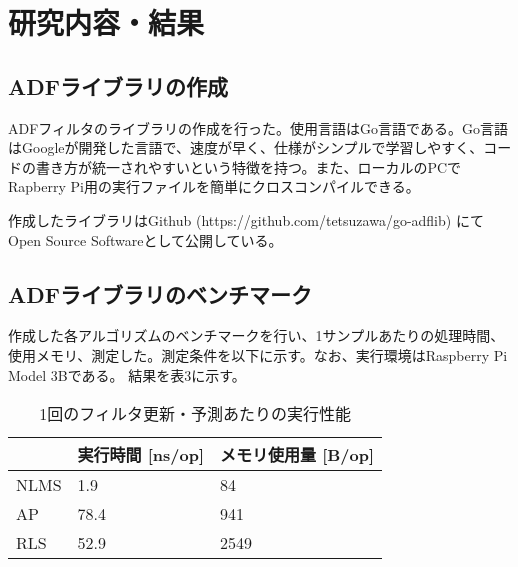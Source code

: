 \documentclass[a4paper]{ltjsarticle}
\begin{document}
\section{研究内容・結果}
  \subsection{ADFライブラリの作成}
    ADFフィルタのライブラリの作成を行った。使用言語はGo言語である。Go言語はGoogleが開発した言語で、速度が早く、仕様がシンプルで学習しやすく、コードの書き方が統一されやすいという特徴を持つ。また、ローカルのPCでRapberry Pi用の実行ファイルを簡単にクロスコンパイルできる。

    作成したライブラリはGithub (https://github.com/tetsuzawa/go-adflib) にてOpen Source Softwareとして公開している。

  \subsection{ADFライブラリのベンチマーク}
    作成した各アルゴリズムのベンチマークを行い、1サンプルあたりの処理時間、使用メモリ、測定した。測定条件を以下に示す。なお、実行環境はRaspberry Pi Model 3Bである。
    結果を表3に示す。

    \begin{table}[]
      \centering
      \caption{1回のフィルタ更新・予測あたりの実行性能}
      \label{tab:exec}
      \begin{tabular}{|l|l|l|}
      \hline
           & 実行時間 [ns/op] & メモリ使用量 [B/op] \\ \hline
      NLMS & 1.9          & 84            \\ \hline
      AP   & 78.4         & 941           \\ \hline
      RLS  & 52.9         & 2549          \\ \hline
      \end{tabular}
      \end{table}

\end{document}
